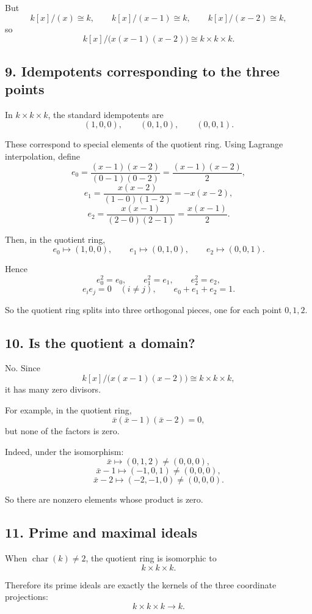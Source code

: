 \documentclass[12pt,a4paper]{article}
\theoremstyle{notespace}
\begin{document}
But
\[
k[x]/(x)\cong k,\qquad
k[x]/(x-1)\cong k,\qquad
k[x]/(x-2)\cong k,
\]
so
\[
k[x]/\bigl(x(x-1)(x-2)\bigr)\cong k\times k\times k.
\]

\subsection{9. Idempotents corresponding to the three points}

In \(k\times k\times k\), the standard idempotents are
\[
(1,0,0),\qquad (0,1,0),\qquad (0,0,1).
\]

These correspond to special elements of the quotient ring. Using Lagrange interpolation, define
\[
e_0=\frac{(x-1)(x-2)}{(0-1)(0-2)}=\frac{(x-1)(x-2)}{2},
\]
\[
e_1=\frac{x(x-2)}{(1-0)(1-2)}=-x(x-2),
\]
\[
e_2=\frac{x(x-1)}{(2-0)(2-1)}=\frac{x(x-1)}{2}.
\]

Then, in the quotient ring,
\[
e_0\longmapsto (1,0,0),\qquad
e_1\longmapsto (0,1,0),\qquad
e_2\longmapsto (0,0,1).
\]

Hence
\[
e_0^2=e_0,\qquad e_1^2=e_1,\qquad e_2^2=e_2,
\]
\[
e_ie_j=0\quad (i\neq j),
\qquad
e_0+e_1+e_2=1.
\]

So the quotient ring splits into three orthogonal pieces, one for each point \(0,1,2\).

\subsection{10. Is the quotient a domain?}

No. Since
\[
k[x]/\bigl(x(x-1)(x-2)\bigr)\cong k\times k\times k,
\]
it has many zero divisors.

For example, in the quotient ring,
\[
\bar x(\bar x-1)(\bar x-2)=0,
\]
but none of the factors is zero.

Indeed, under the isomorphism:
\[
\bar x\longmapsto (0,1,2)\neq (0,0,0),
\]
\[
\bar x-1\longmapsto (-1,0,1)\neq (0,0,0),
\]
\[
\bar x-2\longmapsto (-2,-1,0)\neq (0,0,0).
\]

So there are nonzero elements whose product is zero.

\subsection{11. Prime and maximal ideals}

When \(\operatorname{char}(k)\neq 2\), the quotient ring is isomorphic to
\[
k\times k\times k.
\]

Therefore its prime ideals are exactly the kernels of the three coordinate projections:
\[
k\times k\times k\to k.
\]
\end{document}
